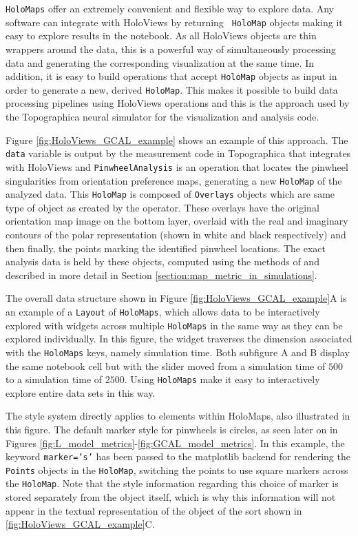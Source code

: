 \documentclass[phd,ianc,twoside]{infthesis}
\begin{document}
{\tt HoloMaps} offer an extremely convenient and flexible way to explore
data. Any software can integrate with HoloViews by returning {\tt
  HoloMap} objects making it easy to explore results in the notebook. As
all HoloViews objects are thin wrappers around the data, this is a
powerful way of simultaneously processing data and generating the
corresponding visualization at the same time. In addition, it is easy to
build operations that accept {\tt HoloMap} objects as input in order to
generate a new, derived {\tt HoloMap}. This makes it possible to build
data processing pipelines using HoloViews operations and this is the
approach used by the Topographica neural simulator
\citep{bednar_bmm08} for the visualization and analysis code.

Figure \ref{fig:HoloViews_GCAL_example} shows an example of this
approach. The {\tt data} variable is output by the measurement code in
Topographica that integrates with HoloViews and {\tt PinwheelAnalysis}
is an operation that locates the pinwheel singularities
from orientation preference maps, generating a new {\tt HoloMap} of the
analyzed data. This {\tt HoloMap} is composed of {\tt Overlays} objects
which are same type of object as created by the {\tt *} operator. These
overlays have the original orientation map image on the bottom layer,
overlaid with the real and imaginary contours of the polar
representation (shown in white and black respectively) and then finally,
the points marking the identified pinwheel locations. The exact analysis
data is held by these objects, computed using the methods of
\citet{lowel_ejn98} and described in more detail in Section
\ref{section:map_metric_in_simulations}.


The overall data structure shown in Figure
\ref{fig:HoloViews_GCAL_example}A is an example of a {\tt Layout} of
{\tt HoloMaps}, which allows data to be interactively explored with
widgets across multiple {\tt HoloMaps} in the same way as they can be
explored individually. In this figure, the widget traverses the dimension
associated with the {\tt HoloMaps} keys, namely simulation time. Both
subfigure A and B display the same notebook cell but with the slider
moved from a simulation time of $500$ to a simulation time of
$2500$. Using {\tt HoloMaps} make it easy to interactively explore
entire data sets in this way.

The style system directly applies to elements within HoloMaps, also
illustrated in this figure. The default marker style for pinwheels is
circles, as seen later on in Figures
\ref{fig:L_model_metrics}-\ref{fig:GCAL_model_metrics}. In this example,
the keyword {\tt marker='s'} has been passed to the matplotlib backend
for rendering the {\tt Points} objects in the {\tt HoloMap}, switching
the points to use square markers across the {\tt HoloMap}. Note that the
style information regarding this choice of marker is stored separately
from the object itself, which is why this information will not appear in
the textual representation of the object of the sort shown in
\ref{fig:HoloViews_GCAL_example}C.
\end{document}
